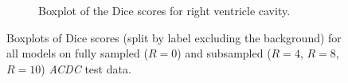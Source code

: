 \begin{figure}[H]
\begin{subfigure}{0.8\textwidth}
    		\caption{Boxplot of the Dice scores for right ventricle cavity.} %
    		\label{fig:Boxplot_DiceScores_RV-Cavity}
	\end{subfigure}
	\caption{Boxplots of Dice scores (split by label excluding the background) for all models on fully sampled ($R=0$) and subsampled ($R=4$, $R=8$, $R=10$) \emph{ACDC} test data.}
	\label{fig:Boxplots_DiceScores}
\end{figure}




